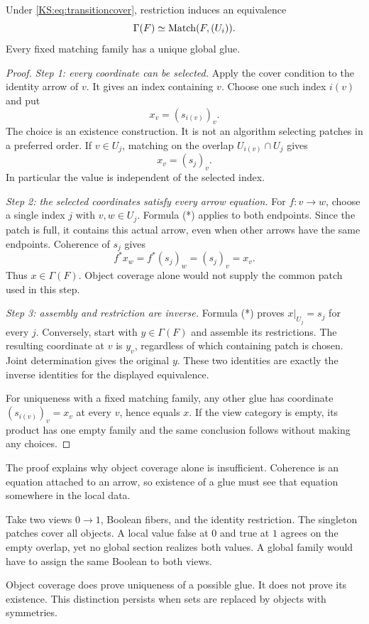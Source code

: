 \begin{KStheorem}\label{KS:KS04}
Under \eqref{KS:eq:transitioncover}, restriction induces an equivalence
\[
 \Gamma(F)\simeq\operatorname{Match}(F,(U_i)).
\]
Every fixed matching family has a unique global glue.
\end{KStheorem}
\begin{proof}
\emph{Step 1: every coordinate can be selected.} Apply the cover condition to the identity arrow of $v$. It gives an index containing $v$. Choose one such index $i(v)$ and put
\[
 x_v=(s_{i(v)})_v.
\]
The choice is an existence construction. It is not an algorithm selecting patches in a preferred order. If $v\in U_j$, matching on the overlap $U_{i(v)}\cap U_j$ gives
\[
 x_v=(s_j)_v.                                                   \tag{*}
\]
In particular the value is independent of the selected index.

\emph{Step 2: the selected coordinates satisfy every arrow equation.} For $f:v\to w$, choose a single index $j$ with $v,w\in U_j$. Formula (*) applies to both endpoints. Since the patch is full, it contains this actual arrow, even when other arrows have the same endpoints. Coherence of $s_j$ gives
\[
 f^*x_w=f^*(s_j)_w=(s_j)_v=x_v.
\]
Thus $x\in\Gamma(F)$. Object coverage alone would not supply the common patch used in this step.

\emph{Step 3: assembly and restriction are inverse.} Formula (*) proves $x|_{U_j}=s_j$ for every $j$. Conversely, start with $y\in\Gamma(F)$ and assemble its restrictions. The resulting coordinate at $v$ is $y_v$, regardless of which containing patch is chosen. Joint determination gives the original $y$. These two identities are exactly the inverse identities for the displayed equivalence.

For uniqueness with a fixed matching family, any other glue has coordinate $(s_{i(v)})_v=x_v$ at every $v$, hence equals $x$. If the view category is empty, its product has one empty family and the same conclusion follows without making any choices.
\end{proof}
The proof explains why object coverage alone is insufficient. Coherence is an equation attached to an arrow, so existence of a glue must see that equation somewhere in the local data.

\begin{KSexample}\label{KS:KS05}
Take two views \(0\to1\), Boolean fibers, and the identity restriction. The singleton patches cover all objects. A local value false at \(0\) and true at \(1\) agrees on the empty overlap, yet no global section realizes both values. A global family would have to assign the same Boolean to both views.
\end{KSexample}
Object coverage does prove uniqueness of a possible glue. It does not prove its existence. This distinction persists when sets are replaced by objects with symmetries.

